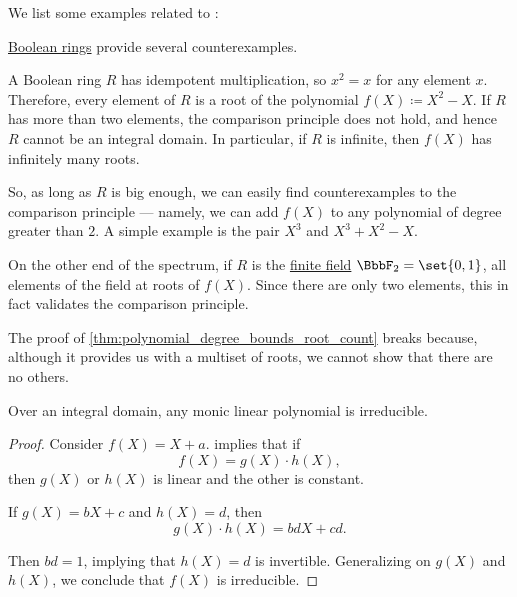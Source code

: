 \begin{example}\label{ex:polynomial_root_uniqueness}
  We list some examples related to :
  \begin{thmenum}
     \hyperref[def:boolean_ring]{Boolean rings} provide several counterexamples.

    A Boolean ring \( R \) has idempotent multiplication, so \( x^2 = x \) for any element \( x \). Therefore, every element of \( R \) is a root of the polynomial \( f(X) \coloneqq X^2 - X \). If \( R \) has more than two elements, the comparison principle does not hold, and hence \( R \) cannot be an integral domain. In particular, if \( R \) is infinite, then \( f(X) \) has infinitely many roots.

    So, as long as \( R \) is big enough, we can easily find counterexamples to the comparison principle --- namely, we can add \( f(X) \) to any polynomial of degree greater than \( 2 \). A simple example is the pair \( X^3 \) and \( X^3 + X^2 - X \).

    On the other end of the spectrum, if \( R \) is the \hyperref[def:finite_field]{finite field} \( \BbbF_2 = \set{ 0, 1 } \), all elements of the field at roots of \( f(X) \). Since there are only two elements, this in fact validates the comparison principle.

    The proof of \cref{thm:polynomial_degree_bounds_root_count} breaks because, although it provides us with a multiset of roots, we cannot show that there are no others.
  \end{thmenum}
\end{example}

\begin{proposition}\label{thm:linear_monic_polynomial_irreducible}
  Over an integral domain, any monic linear polynomial is irreducible.
\end{proposition}
\begin{proof}
  Consider \( f(X) = X + a \).  implies that if
  \begin{equation*}
    f(X) = g(X) \cdot h(X),
  \end{equation*}
  then \( g(X) \) or \( h(X) \) is linear and the other is constant.

  If \( g(X) = bX + c \) and \( h(X) = d \), then
  \begin{equation*}
    g(X) \cdot h(X) = bdX + cd.
  \end{equation*}

  Then \( bd = 1 \), implying that \( h(X) = d \) is invertible. Generalizing on \( g(X) \) and \( h(X) \), we conclude that \( f(X) \) is irreducible.
\end{proof}

